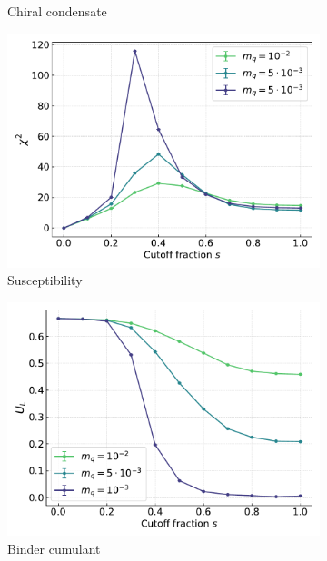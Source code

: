 \begin{figure}[h!]
\begin{subfigure}{0.47\textwidth}
    \caption{Chiral condensate}
\end{subfigure}
\begin{subfigure}{0.47\textwidth}	
	\includegraphics[width=\textwidth]{figures/chiral_PT/chi2.pdf}
    \caption{Susceptibility}
\end{subfigure}
\begin{subfigure}{0.47\textwidth}
	\includegraphics[width=\textwidth]{figures/chiral_PT/binder.pdf}
    \caption{Binder cumulant}
\end{subfigure}\\
\begin{subfigure}{0.47\textwidth}

\end{subfigure}
\end{figure}
